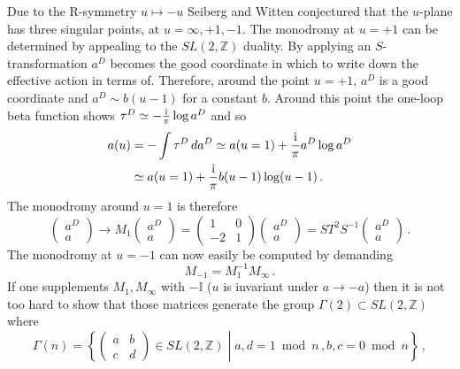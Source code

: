 \documentclass[main.tex]{subfiles}
\begin{document}
Due to the R-symmetry $u\mapsto-u$ Seiberg and Witten conjectured that the $u$-plane has three singular points, at $u=\infty,+1,-1$.  The monodromy at $u=+1$ can be determined by appealing to the $SL(2,\mathbb{Z})$ duality.  By applying an $S$-transformation $a^D$ becomes the good coordinate in which to write down the effective action in terms of.  Therefore, around the point $u=+1$, $a^D$ is a good coordinate and $a^D\sim b(u-1)$ for a constant $b$.  Around this point the one-loop beta function shows $\tau^D\simeq-\frac{\mathrm{i}}{\pi}\log a^D$ and so
\begin{equation}
\begin{aligned}
a(u)&=-\int\tau^D\,da^D\simeq a(u=1)+\frac{\mathrm{i}}{\pi}a^D\log a^D\\
&\simeq a(u=1)+\frac{\mathrm{i}}{\pi}b(u-1)\log(u-1)\,.
\end{aligned}
\end{equation}
The monodromy around $u=1$ is therefore
\begin{equation}
\begin{pmatrix}
a^D\\a
\end{pmatrix}\to M_1\begin{pmatrix}
a^D\\a
\end{pmatrix}=\begin{pmatrix}
1&0\\-2&1
\end{pmatrix}\begin{pmatrix}
a^D\\a
\end{pmatrix}=ST^{2}S^{-1}\begin{pmatrix}
a^D\\a
\end{pmatrix}\,.
\end{equation}
The monodromy at $u=-1$ can now easily be computed by demanding
\begin{equation}
M_{-1}=M_1^{-1}M_{\infty}\,.
\end{equation}
If one supplements $M_1,M_{\infty}$ with $-\mathbb{I}$ ($u$ is invariant under $a\to-a$) then it is not too hard to show that those matrices generate the group $\Gamma(2)\subset SL(2,\mathbb{Z})$ where
\begin{equation}
\Gamma(n)=\left\{\begin{pmatrix}
a&b\\c&d
\end{pmatrix}\in SL(2,\mathbb{Z})\middle|a,d=1\bmod n\,,b,c=0\bmod n\right\}\,,
\end{equation}
\end{document}

